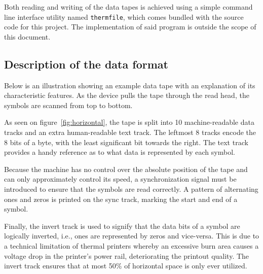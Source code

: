 \documentclass{article}
\begin{document}
	Both reading and writing of the data tapes is achieved using a simple
	command line interface utility named \texttt{thermfile}, which comes
	bundled with the source code for this project. The implementation of said
	program is outside the scope of this document.
	
	\subsection{Description of the data format}
	
	Below is an illustration showing an example data tape with an explanation
	of its characteristic features. As the device pulls the tape through the
	read head, the symbols are scanned from top to bottom.
	
	As seen on figure~\ref{fig:horizontal}, the tape is split into 10
	machine-readable data tracks and an extra human-readable text track. The
	leftmost 8 tracks encode the 8 bits of a byte, with the least significant
	bit towards the right. The text track provides a handy reference as to what
	data is represented by each symbol.
	
	Because the machine has no control over the absolute position of the tape
	and can only approximately control its speed, a synchronization signal must
	be introduced to ensure that the symbols are read correctly. A pattern of
	alternating ones and zeros is printed on the sync track, marking the start
	and end of a symbol.
	
	Finally, the invert track is used to signify that the data bits of a symbol
	are logically inverted, i.e., ones are represented by zeros and vice-versa.
	This is due to a technical limitation of thermal printers whereby an
	excessive burn area causes a voltage drop in the printer's power rail,
	deteriorating the printout quality. The invert track ensures that at most
	50\% of horizontal space is only ever utilized.
	
\end{document}
